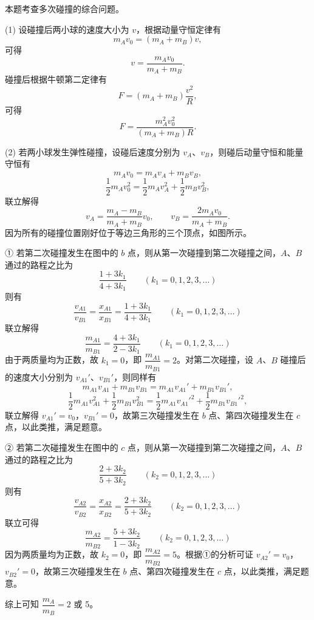 \begin{answer}
本题考查多次碰撞的综合问题。

(1) 设碰撞后两小球的速度大小为 $v$，根据动量守恒定律有
\[
  m_{A}v_{0}=(m_{A}+m_{B})v,
\]
可得
\[
  v=\frac{m_{A}v_{0}}{m_{A}+m_{B}}.
\]
碰撞后根据牛顿第二定律有
\[
  F=(m_{A}+m_{B})\frac{v^{2}}{R},
\]
可得
\[
  F=\frac{m_{A}^{2}v_{0}^{2}}{(m_{A}+m_{B})R}.
\]

(2) 若两小球发生弹性碰撞，设碰后速度分别为 $v_{A}$、$v_{B}$，则碰后动量守恒和能量守恒有
\[
  m_{A}v_{0}=m_{A}v_{A}+m_{B}v_{B},
\]
\[
  \frac{1}{2}m_{A}v_{0}^{2}=\frac{1}{2}m_{A}v_{A}^{2}+\frac{1}{2}m_{B}v_{B}^{2},
\]
联立解得
\[
  v_{A}=\frac{m_{A}-m_{B}}{m_{A}+m_{B}}v_{0},\qquad
  v_{B}=\frac{2m_{A}v_{0}}{m_{A}+m_{B}}.
\]
因为所有的碰撞位置刚好位于等边三角形的三个顶点，如图所示。


① 若第二次碰撞发生在图中的 $b$ 点，则从第一次碰撞到第二次碰撞之间，$A$、$B$ 通过的路程之比为
\[
  \frac{1+3k_{1}}{4+3k_{1}}\qquad(k_{1}=0,1,2,3,\dots)
\]
则有
\[
  \frac{v_{A1}}{v_{B1}}=\frac{x_{A1}}{x_{B1}}=\frac{1+3k_{1}}{4+3k_{1}}\qquad(k_{1}=0,1,2,3,\dots)
\]
联立解得
\[
  \frac{m_{A1}}{m_{B1}}=\frac{4+3k_{1}}{2-3k_{1}}\qquad(k_{1}=0,1,2,3,\dots)
\]
由于两质量均为正数，故 $k_{1}=0$，即 $\dfrac{m_{A1}}{m_{B1}}=2$。对第二次碰撞，设 $A$、$B$ 碰撞后的速度大小分别为 $v_{A1}'$、$v_{B1}'$，则同样有
\[
  m_{A1}v_{A1}+m_{B1}v_{B1}=m_{A1}v_{A1}'+m_{B1}v_{B1}',
\]
\[
  \frac{1}{2}m_{A1}v_{A1}^{2}+\frac{1}{2}m_{B1}v_{B1}^{2}
  =\frac{1}{2}m_{A1}v_{A1}'^{2}+\frac{1}{2}m_{B1}v_{B1}'^{2},
\]
联立解得 $v_{A1}'=v_{0}$，$v_{B1}'=0$，故第三次碰撞发生在 $b$ 点、第四次碰撞发生在 $c$ 点，以此类推，满足题意。

② 若第二次碰撞发生在图中的 $c$ 点，则从第一次碰撞到第二次碰撞之间，$A$、$B$ 通过的路程之比为
\[
  \frac{2+3k_{2}}{5+3k_{2}}\qquad(k_{2}=0,1,2,3,\dots)
\]
则有
\[
  \frac{v_{A2}}{v_{B2}}=\frac{x_{A2}}{x_{B2}}=\frac{2+3k_{2}}{5+3k_{2}}\qquad(k_{2}=0,1,2,3,\dots)
\]
联立可得
\[
  \frac{m_{A2}}{m_{B2}}=\frac{5+3k_{2}}{1-3k_{2}}\qquad(k_{2}=0,1,2,3,\dots)
\]
因为两质量均为正数，故 $k_{2}=0$，即 $\dfrac{m_{A2}}{m_{B2}}=5$。根据①的分析可证 $v_{A2}'=v_{0}$，$v_{B2}'=0$，故第三次碰撞发生在 $b$ 点、第四次碰撞发生在 $c$ 点，以此类推，满足题意。

综上可知 $\dfrac{m_{A}}{m_{B}}=2$ 或 5。


\end{answer}
